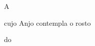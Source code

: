 
\chapter*{}

\thispagestyle{empty}


 \begin{center}A\end{center}

 \begin{center}\end{center}


\begin{center}cujo Anjo contempla o rosto\end{center}

 \begin{center}do\end{center}

 \begin{center}\end{center}


